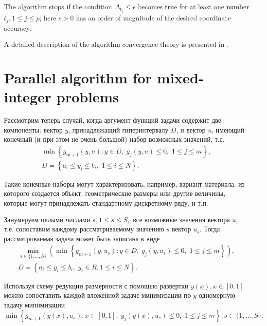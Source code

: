 \documentclass{llncs}
\begin{document}
\begin{enumerate}
\end{enumerate}

The algorithm stops if the condition $\Delta_{t_j}\leq \epsilon$ becomes true for at least one number $t_j, 1\leq j \leq p$; here  $\epsilon>0$ has an order of magnitude of the desired coordinate accuracy.

A detailed description of the algorithm convergence theory is presented in \cite{Strongin2000}.

\section{Parallel algorithm for mixed-integer problems}

Рассмотрим теперь случай, когда аргумент функций задачи содержит две компоненты: вектор $y$, принадлежащий гиперинтервалу $D$, и вектор $u$, имеющий конечный (и при этом не очень большой) набор возможных значений, т.е. 
\begin{gather}\label{problem_i}
\min{\left\{ g_{m+1}(y,u):y\in D, \; g_j(y,u)\leq 0, \; 1 \leq j \leq m\right\}},\\
D=\left\{a_i\leq y_i \leq b_i, \; 1\leq i \leq N \right\}.\nonumber
\end{gather}

Такие конечные наборы могут характеризовать, например, вариант материала, из которого создается объект, геометрические размеры или другие величины, которые могут принадлежать стандартному дискретному ряду, и т.п.

Занумеруем целыми числами $s, 1\leq s \leq S,$ все возможные значения вектора $u$, т.е. сопоставим каждому рассматриваемому значению $s$ вектор $u_s$. 
Тогда рассматриваемая задача может быть записана в виде 
\begin{gather}\label{problem_is}
 \min_{s\in\{1,...,S\}}\left(\min{\left\{ g_{m+1}(y,u_s):y\in D, \; g_j(y,u_s)\leq 0, \; 1 \leq j \leq m\right\}}\right),\\
D=\left\{ a_i\leq y_i \leq b_i, \;  y_i \in R, 1 \leq i\leq N \right\}.\nonumber 
\end{gather}

Используя схему редукции размерности с помощью развертки $y(x), x\in [0,1]$ можно сопоставить каждой вложенной задаче минимизации по $y$ одномерную задачу минимизации
\[
 \min{\left\{ g_{m+1}(y(x),u_s):x \in [0,1], \; g_j(y(x),u_s)\leq 0, \; 1 \leq j \leq m\right\}}, s\in\{1,...,S\}.
\]
\end{document}
